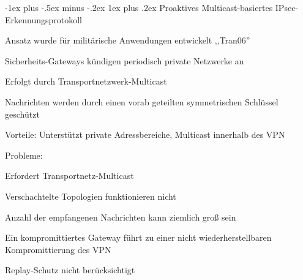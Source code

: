 \documentclass[a4paper]{article}
\makeatletter
\renewcommand{\subsubsection}{\@startsection{subsubsection}{3}{0mm}%
 {-1ex plus -.5ex minus -.2ex}%
 {1ex plus .2ex}%
 {\normalfont\small\bfseries}}
\makeatother
\begin{document}
\begin{multicols}{3}
      \subsubsection{Proaktives Multicast-basiertes IPsec-Erkennungsprotokoll}
      \begin{itemize*}
            \item Ansatz wurde für militärische Anwendungen entwickelt ,,Tran06''
            \item Sicherheits-Gateways kündigen periodisch private Netzwerke an
            \item Erfolgt durch Transportnetzwerk-Multicast
            \item Nachrichten werden durch einen vorab geteilten symmetrischen Schlüssel geschützt
            \item Vorteile: Unterstützt private Adressbereiche, Multicast innerhalb des VPN
            \item Probleme:
            \begin{itemize*}
                  \item Erfordert Transportnetz-Multicast
                  \item Verschachtelte Topologien funktionieren nicht
                  \item Anzahl der empfangenen Nachrichten kann ziemlich groß sein
                  \item Ein kompromittiertes Gateway führt zu einer nicht wiederherstellbaren Kompromittierung des VPN
                  \item Replay-Schutz nicht berücksichtigt
            \end{itemize*}
      \end{itemize*}


\end{multicols}
\end{document}
